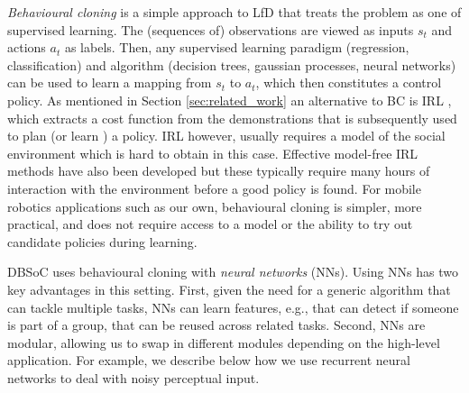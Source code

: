 \documentclass[letterpaper, 10 pt, conference]{ieeeconf}
\newcommand{\sw}[1]{\textcolor{red}{SW: #1}}
\newcommand{\ks}[1]{\textcolor{mypurp}{KS: #1}}
\begin{document}
\emph{Behavioural cloning} is a simple approach to LfD that treats the problem as one of supervised learning. The (sequences of) observations are viewed as inputs $s_t$ and actions $a_t$ as labels.  Then, any supervised learning paradigm (regression, classification) and algorithm (decision trees, gaussian processes, neural networks) \cite{bishop2006pattern} can be used to learn a mapping from $s_t$ to $a_t$, which then constitutes a control policy. As mentioned in Section \ref{sec:related_work} an alternative to BC is IRL \cite{abbeel2004apprenticeship}, which extracts a cost function from the demonstrations that is subsequently used to plan (or learn \cite{boularias2011relative}) a policy. IRL however, usually requires a model of the social environment which is hard to obtain in this case. Effective model-free IRL methods have also been developed \cite{ho2016generative} but these typically require many hours of interaction with the environment before a good policy is found. For mobile robotics applications such as our own, behavioural cloning is simpler, more practical, and does not require access to a model or the ability to try out candidate policies during learning. %

DBSoC uses behavioural cloning with \emph{neural networks} (NNs).  Using NNs has two key advantages in this setting.  First, given the need for a generic algorithm that can tackle multiple tasks, NNs can learn features, e.g., that can detect if someone is part of a group, that can be reused across related tasks.  Second, NNs are modular, allowing us to swap in different modules depending on the high-level application. For example, we describe below how we use
recurrent neural networks to deal with noisy perceptual input.


\end{document}
